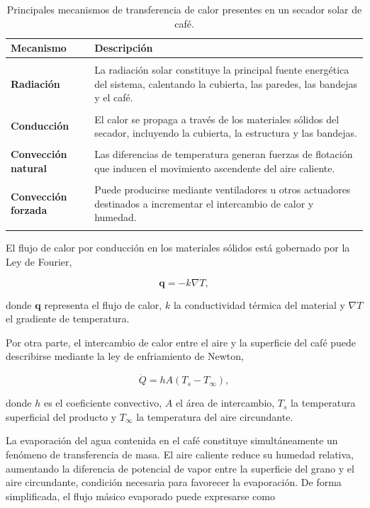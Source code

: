 \begin{table}[h!]
\centering
\begin{tabular}{p{4cm}p{10cm}}
\toprule
\textbf{Mecanismo} & \textbf{Descripción} \\
\midrule
\\
\textbf{Radiación} & La radiación solar constituye la principal fuente energética del sistema, calentando la cubierta, las paredes, las bandejas y el café.\\
\\
\textbf{Conducción} & El calor se propaga a través de los materiales sólidos del secador, incluyendo la cubierta, la estructura y las bandejas.\\
\\
\textbf{Convección natural} & Las diferencias de temperatura generan fuerzas de flotación que inducen el movimiento ascendente del aire caliente.\\
\\
\textbf{Convección forzada} & Puede producirse mediante ventiladores u otros actuadores destinados a incrementar el intercambio de calor y humedad.\\
\\
\bottomrule
\end{tabular}
\caption{Principales mecanismos de transferencia de calor presentes en un secador solar de café.}
\label{tab:heattransfer}
\end{table}

El flujo de calor por conducción en los materiales sólidos está gobernado por la Ley de Fourier,

\begin{equation}
\mathbf{q}=-k\nabla T,
\end{equation}

donde $\mathbf{q}$ representa el flujo de calor, $k$ la conductividad térmica del material y $\nabla T$ el gradiente de temperatura.

Por otra parte, el intercambio de calor entre el aire y la superficie del café puede describirse mediante la ley de enfriamiento de Newton,

\begin{equation}
\dot Q=hA(T_s-T_\infty),
\end{equation}

donde $h$ es el coeficiente convectivo, $A$ el área de intercambio, $T_s$ la temperatura superficial del producto y $T_\infty$ la temperatura del aire circundante.

La evaporación del agua contenida en el café constituye simultáneamente un fenómeno de transferencia de masa. El aire caliente reduce su humedad relativa, aumentando la diferencia de potencial de vapor entre la superficie del grano y el aire circundante, condición necesaria para favorecer la evaporación. De forma simplificada, el flujo másico evaporado puede expresarse como


